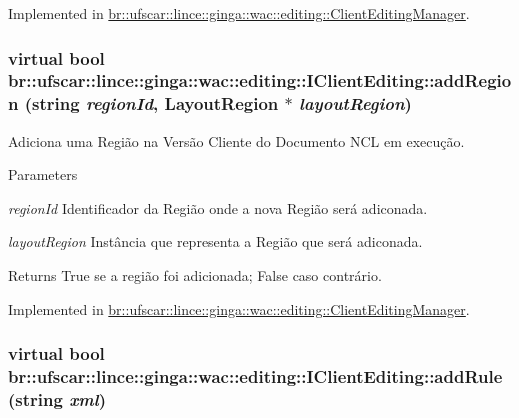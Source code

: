 Implemented in \hyperlink{classbr_1_1ufscar_1_1lince_1_1ginga_1_1wac_1_1editing_1_1ClientEditingManager_a4f4a856d51b586312be91b376ec0d8f3}{br::ufscar::lince::ginga::wac::editing::ClientEditingManager}.

\hypertarget{classbr_1_1ufscar_1_1lince_1_1ginga_1_1wac_1_1editing_1_1IClientEditing_a159d8e1b676431ee5439ad932f07a6bd}{
\subsubsection[{addRegion}]{\setlength{\rightskip}{0pt plus 5cm}virtual bool br::ufscar::lince::ginga::wac::editing::IClientEditing::addRegion (string {\em regionId}, \/  LayoutRegion $\ast$ {\em layoutRegion})}}
\label{classbr_1_1ufscar_1_1lince_1_1ginga_1_1wac_1_1editing_1_1IClientEditing_a159d8e1b676431ee5439ad932f07a6bd}


Adiciona uma Região na Versão Cliente do Documento NCL em execução. 


\begin{DoxyParams}{Parameters}
\item[{\em regionId}]Identificador da Região onde a nova Região será adiconada. \item[{\em layoutRegion}]Instância que representa a Região que será adiconada. \end{DoxyParams}
\begin{DoxyReturn}{Returns}
True se a região foi adicionada; False caso contrário. 
\end{DoxyReturn}


Implemented in \hyperlink{classbr_1_1ufscar_1_1lince_1_1ginga_1_1wac_1_1editing_1_1ClientEditingManager_a554a556985da2aaa32fe3c705d957705}{br::ufscar::lince::ginga::wac::editing::ClientEditingManager}.

\hypertarget{classbr_1_1ufscar_1_1lince_1_1ginga_1_1wac_1_1editing_1_1IClientEditing_a9268c1aa4301692ad9ed3c17e97d5f45}{
\subsubsection[{addRule}]{\setlength{\rightskip}{0pt plus 5cm}virtual bool br::ufscar::lince::ginga::wac::editing::IClientEditing::addRule (string {\em xml})}}
\label{classbr_1_1ufscar_1_1lince_1_1ginga_1_1wac_1_1editing_1_1IClientEditing_a9268c1aa4301692ad9ed3c17e97d5f45}


